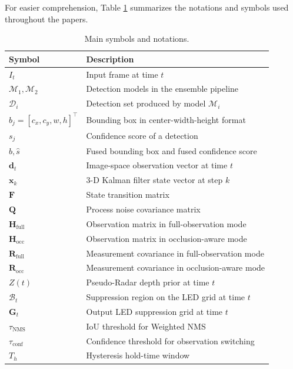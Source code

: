 \documentclass[pdflatex,sn-mathphys-num]{sn-jnl}%
\theoremstyle{thmstyleone}%
\theoremstyle{thmstyletwo}%
\theoremstyle{thmstylethree}%
\begin{document}
For easier comprehension, Table \ref{tab:notations} summarizes the notations and symbols used throughout the papers.

\begin{table}[t]
\centering
\caption{Main symbols and notations.}
\label{tab:notations}
\begin{tabular}{ll}
\hline
\textbf{Symbol} & \textbf{Description} \\
\hline
$I_t$ & Input frame at time $t$ \\
$\mathcal{M}_1, \mathcal{M}_2$ & Detection models in the ensemble pipeline \\
$\mathcal{D}_i$ & Detection set produced by model $\mathcal{M}_i$ \\
$b_j=[c_x,c_y,w,h]^\top$ & Bounding box in center-width-height format \\
$s_j$ & Confidence score of a detection \\
$\hat{b}, \hat{s}$ & Fused bounding box and fused confidence score \\
$\mathbf{d}_t$ & Image-space observation vector at time $t$ \\
$\mathbf{x}_k$ & 3-D Kalman filter state vector at step $k$ \\
$\mathbf{F}$ & State transition matrix \\
$\mathbf{Q}$ & Process noise covariance matrix \\
$\mathbf{H}_{\mathrm{full}}$ & Observation matrix in full-observation mode \\
$\mathbf{H}_{\mathrm{occ}}$ & Observation matrix in occlusion-aware mode \\
$\mathbf{R}_{\mathrm{full}}$ & Measurement covariance in full-observation mode \\
$\mathbf{R}_{\mathrm{occ}}$ & Measurement covariance in occlusion-aware mode \\
$Z(t)$ & Pseudo-Radar depth prior at time $t$ \\
$\mathcal{B}_t$ & Suppression region on the LED grid at time $t$ \\
$\mathbf{G}_t$ & Output LED suppression grid at time $t$ \\
$\tau_{\mathrm{NMS}}$ & IoU threshold for Weighted NMS \\
$\tau_{\mathrm{conf}}$ & Confidence threshold for observation switching \\
$T_h$ & Hysteresis hold-time window \\
\hline
\end{tabular}
\end{table}
\clearpage
\end{document}
